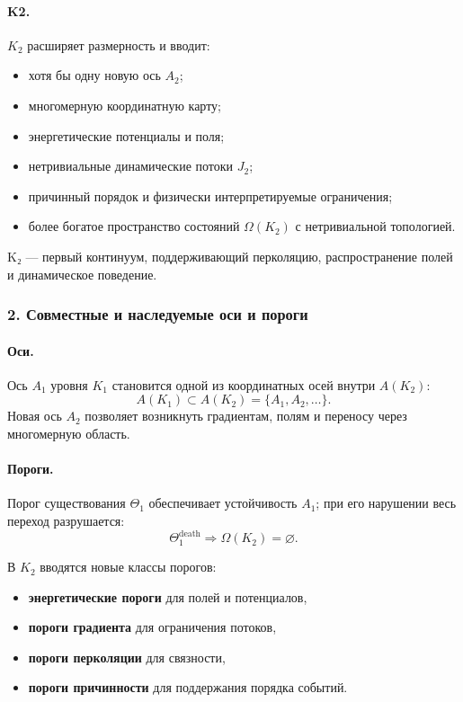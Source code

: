 \paragraph{K2.}
$K_2$ расширяет размерность и вводит:
\begin{itemize}
  \item хотя бы одну новую ось $A_2$;
  \item многомерную координатную карту;
  \item энергетические потенциалы и поля;
  \item нетривиальные динамические потоки $J_2$;
  \item причинный порядок и физически интерпретируемые ограничения;
  \item более богатое пространство состояний $\Omega(K_2)$ с нетривиальной
        топологией.
\end{itemize}

K₂ — первый континуум, поддерживающий перколяцию, распространение полей и
динамическое поведение.

\subsubsection{2. Совместные и наследуемые оси и пороги}

\paragraph{Оси.}
Ось $A_1$ уровня $K_1$ становится одной из координатных осей внутри
$A(K_2)$:
\[
A(K_1) \subset A(K_2) = \{A_1, A_2, \dots\}.
\]
Новая ось $A_2$ позволяет возникнуть градиентам, полям и переносу через
многомерную область.

\paragraph{Пороги.}
Порог существования $\Theta_1$ обеспечивает устойчивость $A_1$; при его
нарушении весь переход разрушается:
\[
\Theta_1^{\mathrm{death}} \Rightarrow \Omega(K_2)=\varnothing.
\]

В $K_2$ вводятся новые классы порогов:
\begin{itemize}
  \item \textbf{энергетические пороги} для полей и потенциалов,
  \item \textbf{пороги градиента} для ограничения потоков,
  \item \textbf{пороги перколяции} для связности,
  \item \textbf{пороги причинности} для поддержания порядка событий.
\end{itemize}

